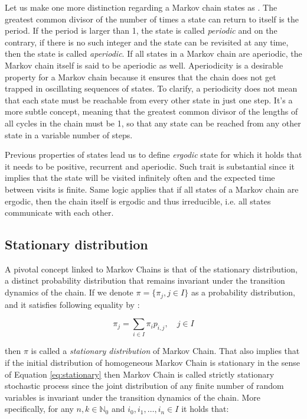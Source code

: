 Let us make one more distinction regarding a Markov chain states as \cite{Gebali2008}. The greatest common divisor of the number of times a state can return to itself is the period. If the period is larger than 1, the state is called \textit{periodic} and 
on the contrary, if there is no such integer and the state can be revisited at any time, then the state is called \textit{aperiodic}.
If all states in a Markov chain are aperiodic, the Markov chain itself is said to be aperiodic as well. Aperiodicity is a desirable property for a Markov chain because it ensures that the chain does not get trapped in oscillating sequences of states. 
To clarify, a periodicity does not mean that each state must be reachable from every other state in just one step. It's a more subtle concept, meaning that the greatest common divisor of the lengths of all cycles in the chain must be 1, so that any state can be reached from any other state in a variable number of steps.

Previous properties of states lead us to define \textit{ergodic} state for which it holds that it needs to be positive, recurrent and aperiodic. Such trait is substantial since it implies that the state will be visited infinitely often and the expected time between visits is finite.
Same logic applies that if all states of a Markov chain are ergodic, then the chain itself is ergodic and thus irreducible, i.e. all states communicate with each other.

\subsection{Stationary distribution}

A pivotal concept linked to Markov Chains is that of the stationary distribution, a distinct probability 
distribution that remains invariant under the transition dynamics of the chain. 
If we denote $\pi = \{\pi_j,j \in I\}$ as a probability distribution, and it satisfies following equality by \cite{Bremaud1999}:

\begin{equation} \label{eq:stationary}
    \pi_j = \sum_{i \in I} \pi_i p_{i,j}, \quad j \in I
\end{equation}

then $\pi$ is called a \textit{stationary distribution} of Markov Chain. That also implies that if the initial distribution of homogeneous Markov Chain is stationary in the sense of Equation \ref{eq:stationary}
then Markov Chain is called strictly stationary stochastic process since the joint distribution of any finite number of random variables is invariant under the transition dynamics of the chain.
More specifically, for any $n,k \in \mathbb{N}_0$ and $i_0,i_1,\ldots,i_n \in I$ it holds that:

